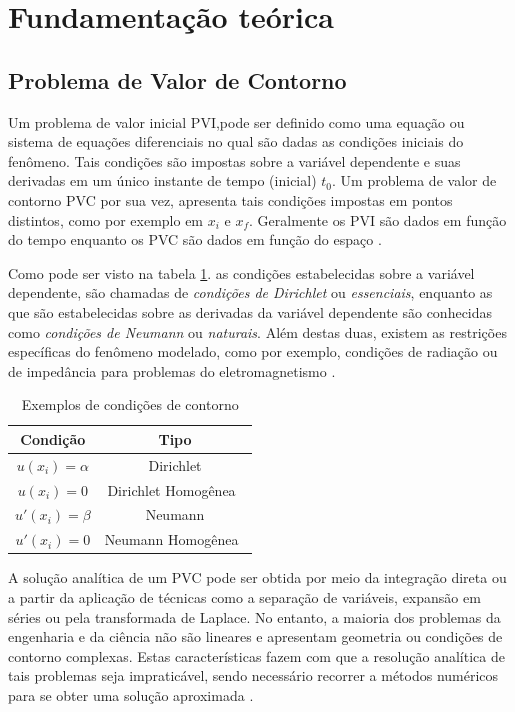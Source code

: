 \documentclass[
    12pt,               %
    openright,          %
    oneside,
    a4paper,            %
    english,            %
    french,             %
    spanish,            %
    brazil              %
    ]{abntex2}
\begin{document}
\section{Fundamentação teórica}



\subsection{Problema de Valor de Contorno}
\label{sec:PVC}


Um problema de valor inicial PVI,pode ser definido como uma equação ou sistema de equações diferenciais no qual são dadas as condições iniciais do fenômeno. Tais condições são impostas sobre a variável dependente e suas derivadas em um único instante de tempo (inicial) $t_0$. Um problema de valor de contorno PVC por sua vez, apresenta tais condições impostas em pontos distintos, como por exemplo em $x_i$ e $x_f$. Geralmente os PVI são dados em função do tempo enquanto os PVC são dados em função do espaço \cite{boyceDiprima}.

Como pode ser visto na tabela \ref{tab:cond}. as condições estabelecidas sobre a variável dependente, são chamadas de \textit{condições de Dirichlet} ou \textit{essenciais}, enquanto as que são estabelecidas sobre as derivadas da variável dependente são  conhecidas como \textit{condições de Neumann} ou  \textit{naturais}. Além destas duas, existem as restrições específicas do fenômeno modelado, como por exemplo, condições de radiação ou de impedância para problemas do eletromagnetismo \cite{jin}. 


\begin{table}   
	\centering
	\begin{tabular}{|c|c|}  
		\hline
		\textbf{Condição} 
		& \textbf{Tipo} \\  
		\hline
		$u(x_i) = \alpha $ 
		& Dirichlet \\
		\hline
		$u(x_i) = 0$
		& Dirichlet Homogênea\  \\
		\hline
		$u'(x_i) = \beta$
		& Neumann \\
		\hline
		$u'(x_i) = 0$
		& Neumann Homogênea\  \\
		\hline
	\end{tabular}
	\caption{Exemplos de condições de contorno}
	\label{tab:cond}
\end{table}


A solução analítica de um PVC pode ser obtida por meio da integração direta ou a partir da aplicação de técnicas como a separação de variáveis, expansão em séries ou pela transformada de Laplace.
No entanto, a maioria dos problemas da engenharia e da ciência não são lineares e apresentam geometria ou condições de contorno complexas.  Estas características fazem com que a resolução analítica de tais problemas seja impraticável, sendo necessário recorrer a métodos numéricos para se obter uma solução aproximada \cite{boyceDiprima, powers}.
\end{document}
